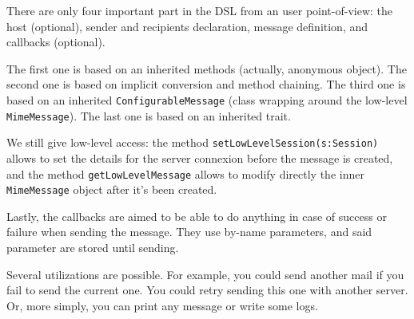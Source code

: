 \documentclass[10pt,a4paper]{article}
\begin{document}
	\vskip 10pt
	There are only four important part in the DSL from an user point-of-view: the host (optional), sender and recipients declaration, message definition, and callbacks (optional).
	
	The first one is based on an inherited methods (actually, anonymous object). The second one is based on implicit conversion and method chaining. The third one is based on an inherited \texttt{ConfigurableMessage} (class wrapping around the low-level \texttt{MimeMessage}). The last one is based on an inherited trait.
	
	\vskip 10pt
	We still give low-level access: the method \texttt{setLowLevelSession(s:Session)} allows to set the details for the server connexion before the message is created, and the method \texttt{getLowLevelMessage} allows to modify directly the inner \texttt{MimeMessage} object after it's been created.
	
	\vskip 10pt
	Lastly, the callbacks are aimed to be able to do anything in case of success or failure when sending the message. They use by-name parameters, and said parameter are stored until sending.
	
	Several utilizations are possible. For example, you could send another mail if you fail to send the current one. You could retry sending this one with another server. Or, more simply, you can print any message or write some logs.
	
\end{document}
